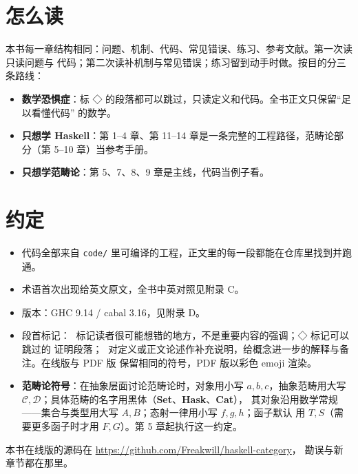 \section{怎么读}\label{ux600eux4e48ux8bfb}

本书每一章结构相同：问题、机制、代码、常见错误、练习、参考文献。第一次读只读问题与
代码；第二次读补机制与常见错误；练习留到动手时做。按目的分三条路线：

\begin{itemize}
\tightlist
\item
  \textbf{数学恐惧症}：标 ◇ 的段落都可以跳过，只读定义和代码。全书正文只保留“足以看懂代码”
  的数学。
\item
  \textbf{只想学 Haskell}：第 1--4 章、第 11--14 章是一条完整的工程路径，范畴论部分（第 5--10
  章）当参考手册。
\item
  \textbf{只想学范畴论}：第 5、7、8、9 章是主线，代码当例子看。
\end{itemize}

\section{约定}\label{ux7ea6ux5b9a}

\begin{itemize}
\tightlist
\item
  代码全部来自 \passthrough{\lstinline!code/!} 里可编译的工程，正文里的每一段都能在仓库里找到并跑通。
\item
  术语首次出现给英文原文，全书中英对照见附录 C。
\item
  版本：GHC 9.14 / cabal 3.16，见附录 D。
\item
  段首标记：🦂 标记读者很可能想错的地方，不是重要内容的强调；◇ 标记可以跳过的
  证明段落；📌 对定义或正文论述作补充说明，给概念进一步的解释与备注。在线版与 PDF 版
  保留相同的符号，PDF 版以彩色 emoji 渲染。
\item
  \textbf{范畴论符号}：在抽象层面讨论范畴论时，对象用小写 \(a, b, c\)，抽象范畴用大写
  \(\mathcal{C}, \mathcal{D}\)；具体范畴的名字用黑体（\textbf{Set}、\textbf{Hask}、\textbf{Cat}），
  其对象沿用数学常规------集合与类型用大写 \(A, B\)；态射一律用小写 \(f, g, h\)；函子默认
  用 \(T, S\)（需要更多函子时才用 \(F, G\)）。第 5 章起执行这一约定。
\end{itemize}

本书在线版的源码在 \url{https://github.com/Freakwill/haskell-category}，
勘误与新章节都在那里。
